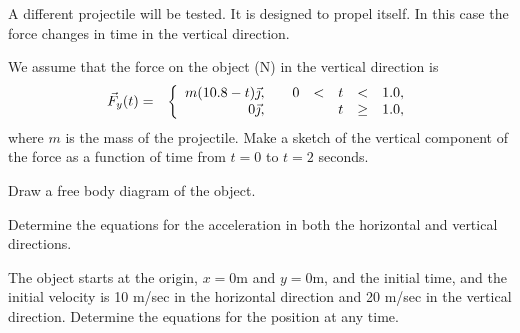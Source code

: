 \begin{problem}
\item A different projectile will be tested. It is designed to propel
  itself. In this case the force changes in time in the vertical
  direction.
  \begin{subproblem}
  \item We assume that the force on the object (N) in the vertical
    direction is
      \begin{eqnarray*}
        \vec{F}_y(t) & = & \left\{
                     \begin{array}{r@{\hspace{2em}}rcccl}
                       m(10.8-t) \vec{\jmath}, & 0 & < & t & < & 1.0, \\
                       0 \vec{\jmath},       &   &   & t & \geq & 1.0,
                     \end{array}
                     \right.
      \end{eqnarray*}
      where $m$ is the mass of the projectile.  Make a sketch of the
      vertical component of the force as a function of time from $t=0$
      to $t=2$ seconds.  

      \vfill

    \item Draw a free body diagram of the object.
      \vfill

    \item Determine the equations for the acceleration in both the
      horizontal and vertical directions.

      \vfill

      \clearpage

    \item The object starts at the origin, $x=0$m and $y=0$m, and the
      initial time, and the initial velocity is 10 m/sec in the
      horizontal direction and 20 m/sec in the vertical
      direction. Determine the equations for the position at any time.

      \vfill

  \end{subproblem}

\clearpage



\end{problem}

\postClass

